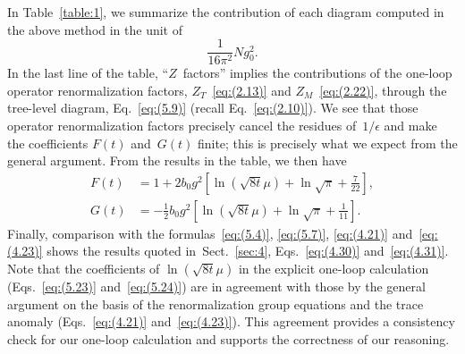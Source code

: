 In Table~\ref{table:1}, we summarize the contribution of each diagram
computed in the above method in the unit of
\begin{equation}
   \frac{1}{16\pi^2}Ng_0^2.
\label{eq:(5.22)}
\end{equation}
In the last line of the table, ``$Z$~factors'' implies the contributions of the
one-loop operator renormalization factors, $Z_T$~\eqref{eq:(2.13)} and
$Z_M$~\eqref{eq:(2.22)}, through the tree-level diagram, Eq.~\eqref{eq:(5.9)}
(recall Eq.~\eqref{eq:(2.10)}). We see that those operator renormalization
factors precisely cancel the residues of~$1/\epsilon$ and make the coefficients
$F(t)$ and~$G(t)$ finite; this is precisely what we expect from the general
argument. From the results in the table, we then have
\begin{align}
   F(t)&=1+2b_0g^2
   \left[\ln(\sqrt{8t}\mu)+\ln\sqrt{\pi}+\frac{7}{22}\right],
\label{eq:(5.23)}
\\
   G(t)&=-\frac{1}{2}b_0g^2
   \left[\ln(\sqrt{8t}\mu)+\ln\sqrt{\pi}+\frac{1}{11}\right].
\label{eq:(5.24)}
\end{align}
Finally, comparison with the formulas~\eqref{eq:(5.4)}, \eqref{eq:(5.7)},
\eqref{eq:(4.21)} and~\eqref{eq:(4.23)} shows the results quoted
in~Sect.~\ref{sec:4}, Eqs.~\eqref{eq:(4.30)} and~\eqref{eq:(4.31)}. Note that
the coefficients of $\ln(\sqrt{8t}\mu)$ in the explicit one-loop calculation
(Eqs.~\eqref{eq:(5.23)} and~\eqref{eq:(5.24)}) are in agreement with those by
the general argument on the basis of the renormalization group equations and
the trace anomaly (Eqs.~\eqref{eq:(4.21)} and~\eqref{eq:(4.23)}). This
agreement provides a consistency check for our one-loop calculation and
supports the correctness of our reasoning.

